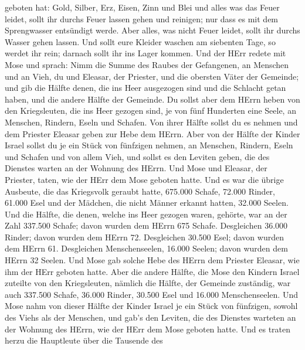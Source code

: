 geboten hat:  Gold, Silber, Erz, Eisen, Zinn und Blei
 und alles was das Feuer leidet, sollt ihr durchs Feuer
lassen gehen und reinigen; nur dass es mit dem Sprengwasser entsündigt
werde. Aber alles, was nicht Feuer leidet, sollt ihr durchs Wasser gehen
lassen.  Und sollt eure Kleider waschen am siebenten Tage,
so werdet ihr rein; darnach sollt ihr ins Lager kommen. 
Und der HErr redete mit Mose und sprach:  Nimm die Summe
des Raubes der Gefangenen, an Menschen und an Vieh, du und Eleasar, der
Priester, und die obersten Väter der Gemeinde;  und gib die
Hälfte denen, die ins Heer ausgezogen sind und die Schlacht getan haben,
und die andere Hälfte der Gemeinde.  Du sollst aber dem
HErrn heben von den Kriegsleuten, die ins Heer gezogen sind, je von fünf
Hunderten eine Seele, an Menschen, Rindern, Eseln und Schafen.
 Von ihrer Hälfte sollst du es nehmen und dem Priester
Eleasar geben zur Hebe dem HErrn.  Aber von der Hälfte der
Kinder Israel sollst du je ein Stück von fünfzigen nehmen, an Menschen,
Rindern, Eseln und Schafen und von allem Vieh, und sollst es den Leviten
geben, die des Dienstes warten an der Wohnung des HErrn. 
Und Mose und Eleasar, der Priester, taten, wie der HErr dem Mose geboten
hatte.  Und es war die übrige Ausbeute, die das Kriegsvolk
geraubt hatte, 675.000 Schafe,  72.000 Rinder,
 61.000 Esel  und der Mädchen, die nicht
Männer erkannt hatten, 32.000 Seelen.  Und die Hälfte, die
denen, welche ins Heer gezogen waren, gehörte, war an der Zahl 337.500
Schafe;  davon wurden dem HErrn 675 Schafe. 
Desgleichen 36.000 Rinder; davon wurden dem HErrn 72. 
Desgleichen 30.500 Esel; davon wurden dem HErrn 61. 
Desgleichen Menschenseelen, 16.000 Seelen; davon wurden dem HErrn 32
Seelen.  Und Mose gab solche Hebe des HErrn dem Priester
Eleasar, wie ihm der HErr geboten hatte.  Aber die andere
Hälfte, die Mose den Kindern Israel zuteilte von den Kriegsleuten,
 nämlich die Hälfte, der Gemeinde zuständig, war auch
337.500 Schafe,  36.000 Rinder,  30.500 Esel
 und 16.000 Menschenseelen.  Und Mose nahm von
dieser Hälfte der Kinder Israel je ein Stück von fünfzigen, sowohl des
Viehs als der Menschen, und gab's den Leviten, die des Dienstes warteten
an der Wohnung des HErrn, wie der HErr dem Mose geboten hatte.
 Und es traten herzu die Hauptleute über die Tausende des
